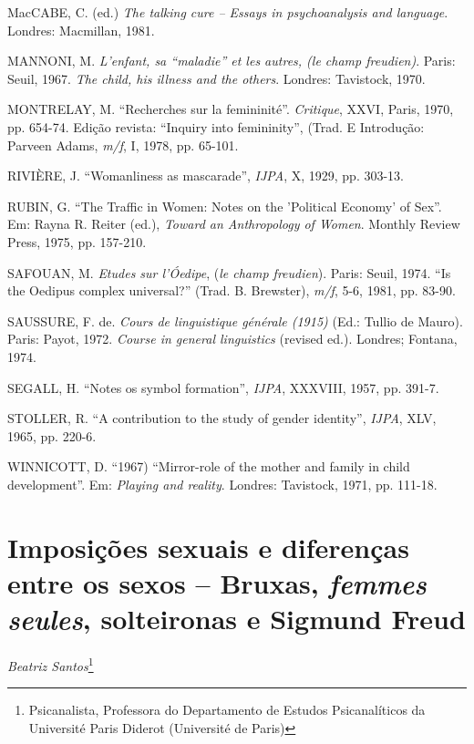 MacCABE, C. (ed.) \emph{The talking cure -- Essays in psychoanalysis and
language}. Londres: Macmillan, 1981.

MANNONI, M. \emph{L'enfant, sa ``maladie'' et les autres, (le champ
freudien)}. Paris: Seuil, 1967. \emph{The child, his illness and the
others}. Londres: Tavistock, 1970.

MONTRELAY, M. ``Recherches sur la femininité''. \emph{Critique}, XXVI,
Paris, 1970, pp. 654-74. Edição revista: ``Inquiry into femininity'',
(Trad. E Introdução: Parveen Adams, \emph{m/f}, I, 1978, pp. 65-101.

RIVIÈRE, J. ``Womanliness as mascarade'', \emph{IJPA}, X, 1929, pp.
303-13.

RUBIN, G. ``The Traffic in Women: Notes on the 'Political Economy' of
Sex''. Em: Rayna R. Reiter (ed.), \emph{Toward an Anthropology of
Women}. Monthly Review Press, 1975, pp. 157-210.

SAFOUAN, M. \emph{Etudes sur l'Óedipe}, (\emph{le champ freudien}).
Paris: Seuil, 1974. ``Is the Oedipus complex universal?'' (Trad. B.
Brewster), \emph{m/f}, 5-6, 1981, pp. 83-90.

SAUSSURE, F. de. \emph{Cours de linguistique générale (1915)} (Ed.:
Tullio de Mauro). Paris: Payot, 1972. \emph{Course in general
linguistics} (revised ed.). Londres; Fontana, 1974.

SEGALL, H. ``Notes os symbol formation'', \emph{IJPA}, XXXVIII, 1957,
pp. 391-7.

STOLLER, R. ``A contribution to the study of gender identity'',
\emph{IJPA}, XLV, 1965, pp. 220-6.

WINNICOTT, D. ``1967) ``Mirror-role of the mother and family in child
development''. Em: \emph{Playing and reality}. Londres: Tavistock, 1971,
pp. 111-18.

\chapter*{Imposições sexuais e diferenças entre os sexos -- Bruxas,
\emph{femmes seules}, solteironas e Sigmund Freud}


\begin{flushright}
\emph{Beatriz Santos}\footnote{Psicanalista, Professora do Departamento de Estudos Psicanalíticos da Université Paris Diderot (Université de Paris)}
\end{flushright}


